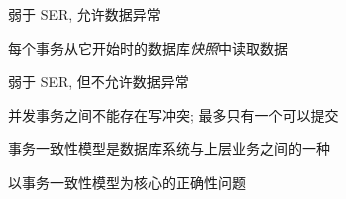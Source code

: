 \begin{frame}{}
  \begin{center}
     弱于 SER, 允许数据异常

    \vspace{0.50cm}
		\resizebox{0.50\textwidth}{!}{}

    \vspace{0.20cm}
     每个事务从它开始时的数据库{\it 快照}中读取数据
  \end{center}
\end{frame}

\begin{frame}{}
  \begin{center}
     弱于 SER, 但不允许数据异常

    \vspace{0.30cm}
    \resizebox{0.48\textwidth}{!}{}
  \end{center}

  \vspace{-0.50cm}
    并发事务之间不能存在写冲突; 最多只有一个可以提交
\end{frame}

\begin{frame}{}
  \begin{center}
    事务一致性模型是数据库系统与上层业务之间的一种

    \vspace{0.30cm}
  \end{center}
\end{frame}

\begin{frame}{}
  \begin{center}
    以事务一致性模型为核心的正确性问题

    \vspace{0.50cm}
  \end{center}
\end{frame}

\begin{frame}{}
\end{frame}
